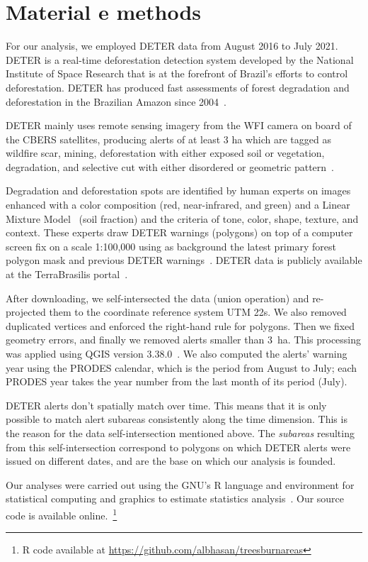 \section{Material e methods}

For our analysis, we employed DETER data from August 2016 to July 2021. 
DETER is a real-time deforestation detection system developed by the National Institute of Space Research that is at the forefront of Brazil's efforts to control deforestation.
DETER has produced fast assessments of forest degradation and deforestation in the Brazilian Amazon since 2004~\cite{shimabukuro2006}. 

DETER mainly uses remote sensing imagery from the WFI camera on board of the CBERS satellites, producing alerts  of at least 3 ha which are tagged as wildfire scar, mining, deforestation with either exposed soil or vegetation, degradation, and selective cut with either disordered or geometric pattern~\cite{diniz2015a,f.g.assis2019}. 

Degradation and deforestation spots are identified by human experts on images enhanced with a color composition (red, near-infrared, and green) and a Linear Mixture Model~\cite{shimabukuro1991} (soil fraction) and the criteria of tone, color, shape, texture, and context. 
These experts draw DETER warnings (polygons) on top of a computer screen fix on a scale 1:100,000 using as background the latest primary forest polygon mask and previous DETER warnings~\cite{dealmeida2022}.
DETER data is publicly available at the TerraBrasilis portal~\cite{f.g.assis2019}. 

After downloading, we self-intersected the data (union operation) and re-projected them to the coordinate reference system UTM 22s.
We also removed duplicated vertices and enforced the right-hand rule for polygons.
Then we fixed geometry errors, and finally we removed alerts smaller than 3~ha.
This processing was applied using QGIS version 3.38.0~\cite{QGIS_software}.
We also computed the alerts' warning year using the PRODES calendar, which is the period from August to July; each PRODES year takes the year number from the last month of its period (July).

DETER alerts don't spatially match over time.
This means that it is only possible to match alert subareas consistently along the time dimension.
This is the reason for the data self-intersection mentioned above.
The \textit{subareas} resulting from this self-intersection correspond to polygons on which DETER alerts were issued on different dates, and are the base on which our analysis is founded.

Our analyses were carried out using the GNU's R language and environment for statistical computing and graphics to estimate statistics analysis~\cite{ihaka1996}.
Our source code is available online.~\footnote{R code available at \url{https://github.com/albhasan/treesburnareas}}
